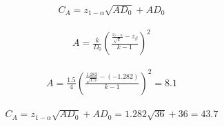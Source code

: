 \documentclass[12pt]{article}
\begin{document}
\pagestyle{empty} 
\Large
{}
\pagecolor{ehandbook}

\boldmath


\begin{eqnarray*}
C_A = z_{1-\alpha} \sqrt{AD_0} + AD_0
\end{eqnarray*}

\hspace*{.25in}
 
\begin{eqnarray*}
A = \frac{k}{D_0} \left( \frac{\frac{z_{1-\alpha}}{\sqrt{k}} - z_\beta} {k-1} \right)^2
\end{eqnarray*}

\hspace*{.25in}

\begin{eqnarray*}
A = \frac{1.5}{4} \left( \frac{\frac{1.282}{\sqrt{1.5}} -  (-1.282)}{k-1} \right) ^ 2 = 8.1
\end{eqnarray*}

\hspace*{.25in}

\begin{eqnarray*}
C_A = z_{1-\alpha} \sqrt{AD_0} + AD_0 = 1.282 \sqrt{36} + 36 = 43.7
\end{eqnarray*}
\end{document}
